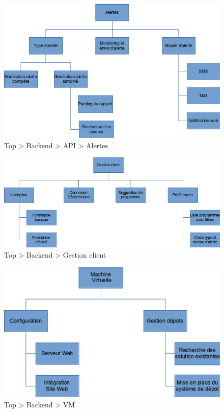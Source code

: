 \begin{figure}[H]
  \vspace*{2cm}
  \caption{Top \textgreater{} Backend \textgreater{} API \textgreater{} Alertes}
  \centering
  \vspace*{0.5cm}
  \includegraphics[max width=18cm]{wbs3_backend_api_alertes.png}
\end{figure}

\begin{figure}[H]
  \vspace*{2cm}
  \caption{Top \textgreater{} Backend \textgreater{} Gestion client}
  \centering
  \vspace*{0.5cm}
  \includegraphics[max width=18cm]{wbs3_backend_gestionclient.png}
\end{figure}

\begin{figure}[H]
  \vspace*{2cm}
  \caption{Top \textgreater{} Backend \textgreater{} VM}
  \centering
  \vspace*{0.5cm}
  \includegraphics[max width=18cm]{wbs3_vm.png}
\end{figure}

